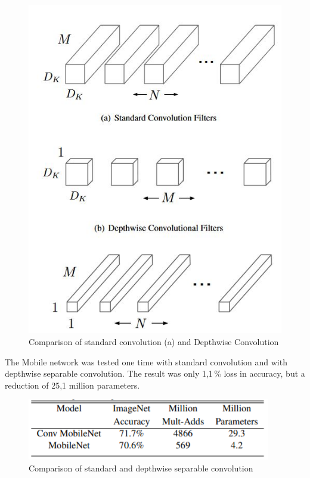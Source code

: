 \begin{figure}[H]
\centering
\includegraphics[scale=0.65]{sources/depthwise_convolution.JPG}
\caption[Comparison standard and depthwise]{Comparison of standard convolution (a) and Depthwise Convolution \cite{tim2,tim3}}
\label{fig:depthwise_convolution}
\end{figure}

The Mobile network was tested one time with standard convolution and with depthwise separable convolution. The result was only 1,1\,\% loss in accuracy, but a reduction of 25,1 million parameters. 

\begin{figure}[H]
\centering
\includegraphics{sources/Comparison_Mobilenet.png}
\caption[Comparison standard and separable depthwise]{Comparison of standard and depthwise separable convolution}
\label{fig:depthwise_convolution}
\end{figure}

